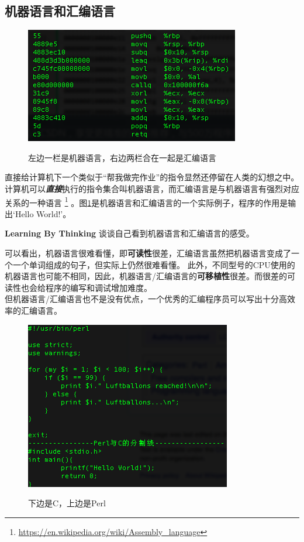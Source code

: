 \subsection{机器语言和汇编语言}
\begin{figure}[htbp]
\centering\includegraphics{image/machine_code_and_assemble.png}\\
\caption{左边一栏是机器语言，右边两栏合在一起是汇编语言}\label{fig.machine.language}
\end{figure}
直接给计算机下一个类似于“帮我做完作业”的指令显然还停留在人类的幻想之中。\\
计算机可以\textbf{\textit{直接}}执行的指令集合叫机器语言，而汇编语言是与机器语言有强烈对应关系的一种语言
\footnote{\url{https://en.wikipedia.org/wiki/Assembly_language}}
。图\ref{fig.machine.language}是机器语言和汇编语言的一个实际例子，程序的作用是输出`Hello World!'。\\
\begin{paperbox}{\textbf{Learning By Thinking}\starfour}
谈谈自己看到机器语言和汇编语言的感受。
\end{paperbox}
可以看出，机器语言很难看懂，即\textbf{可读性}很差，汇编语言虽然把机器语言变成了一个一个单词组成的句子，但实际上仍然很难看懂。
此外，不同型号的CPU使用的机器语言也可能不相同，因此，机器语言/汇编语言的\textbf{可移植性}很差。而很差的可读性也会给程序的编写和调试增加难度。\\
但机器语言/汇编语言也不是没有优点，一个优秀的汇编程序员可以写出十分高效率的汇编语言。
\begin{figure}[htb]
\centering\includegraphics{image/perl_c.png}\\
\caption{下边是C，上边是Perl}\label{fig.high.level.language}
\end{figure}
